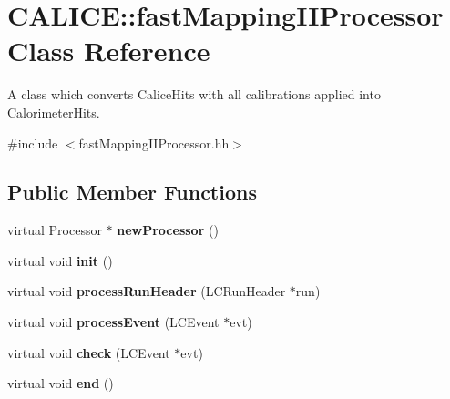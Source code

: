 \section{CALICE::fastMappingIIProcessor Class Reference}
\label{classCALICE_1_1fastMappingIIProcessor}


A class which converts CaliceHits with all calibrations applied into CalorimeterHits.  


{\ttfamily \#include $<$fastMappingIIProcessor.hh$>$}\subsection*{Public Member Functions}
\begin{DoxyCompactItemize}
\item 
virtual Processor $\ast$ {\bfseries newProcessor} ()\label{classCALICE_1_1fastMappingIIProcessor_a84d864c37b51a69f3a5bb3336d11290b}

\item 
virtual void {\bfseries init} ()\label{classCALICE_1_1fastMappingIIProcessor_ad804302fd35900a04771a1647ee9584c}

\item 
virtual void {\bfseries processRunHeader} (LCRunHeader $\ast$run)\label{classCALICE_1_1fastMappingIIProcessor_a4dcdb93e7877928387c0da90288cd243}

\item 
virtual void {\bfseries processEvent} (LCEvent $\ast$evt)\label{classCALICE_1_1fastMappingIIProcessor_ae133d2ea34fae73e13cbbb23d567eef6}

\item 
virtual void {\bfseries check} (LCEvent $\ast$evt)\label{classCALICE_1_1fastMappingIIProcessor_ade7ed6e2dea19fb8b0dce38bececbab4}

\item 
virtual void {\bfseries end} ()\label{classCALICE_1_1fastMappingIIProcessor_a720b8590ee681bb8f78bca09370129b7}

\end{DoxyCompactItemize}
